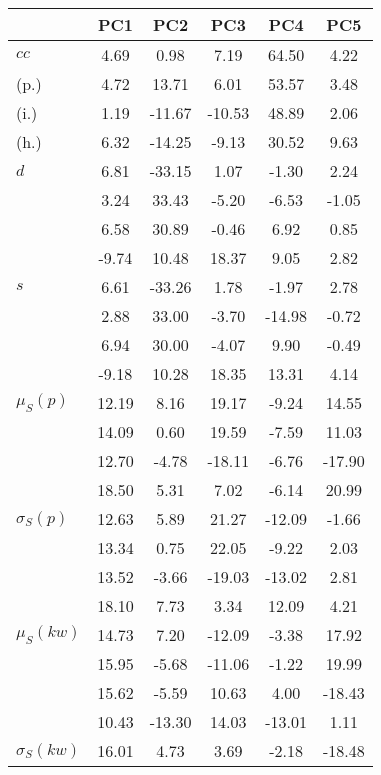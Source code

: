 \begin{table}[h!]
\begin{center}
\begin{tabular}{| l | c | c | c | c | c |}\hline
 & PC1 & PC2 & PC3 & PC4 & PC5 \\\hline
$cc$ & 4.69  & 0.98  & 7.19  & 64.50  & 4.22 \\\hline
(p.) & 4.72  & 13.71  & 6.01  & 53.57  & 3.48 \\\hline
(i.) & 1.19  & -11.67  & -10.53  & 48.89  & 2.06 \\\hline
(h.) & 6.32  & -14.25  & -9.13  & 30.52  & 9.63 \\\hline
$d$ & 6.81  & -33.15  & 1.07  & -1.30  & 2.24 \\\hline
 & 3.24  & 33.43  & -5.20  & -6.53  & -1.05 \\\hline
 & 6.58  & 30.89  & -0.46  & 6.92  & 0.85 \\\hline
 & -9.74  & 10.48  & 18.37  & 9.05  & 2.82 \\\hline
$s$ & 6.61  & -33.26  & 1.78  & -1.97  & 2.78 \\\hline
 & 2.88  & 33.00  & -3.70  & -14.98  & -0.72 \\\hline
 & 6.94  & 30.00  & -4.07  & 9.90  & -0.49 \\\hline
 & -9.18  & 10.28  & 18.35  & 13.31  & 4.14 \\\hline
$\mu_S(p)$ & 12.19  & 8.16  & 19.17  & -9.24  & 14.55 \\\hline
 & 14.09  & 0.60  & 19.59  & -7.59  & 11.03 \\\hline
 & 12.70  & -4.78  & -18.11  & -6.76  & -17.90 \\\hline
 & 18.50  & 5.31  & 7.02  & -6.14  & 20.99 \\\hline
$\sigma_S(p)$ & 12.63  & 5.89  & 21.27  & -12.09  & -1.66 \\\hline
 & 13.34  & 0.75  & 22.05  & -9.22  & 2.03 \\\hline
 & 13.52  & -3.66  & -19.03  & -13.02  & 2.81 \\\hline
 & 18.10  & 7.73  & 3.34  & 12.09  & 4.21 \\\hline
$\mu_S(kw)$ & 14.73  & 7.20  & -12.09  & -3.38  & 17.92 \\\hline
 & 15.95  & -5.68  & -11.06  & -1.22  & 19.99 \\\hline
 & 15.62  & -5.59  & 10.63  & 4.00  & -18.43 \\\hline
 & 10.43  & -13.30  & 14.03  & -13.01  & 1.11 \\\hline
$\sigma_S(kw)$ & 16.01  & 4.73  & 3.69  & -2.18  & -18.48 \\\hline

\end{tabular}
\end{center}
\end{table}
